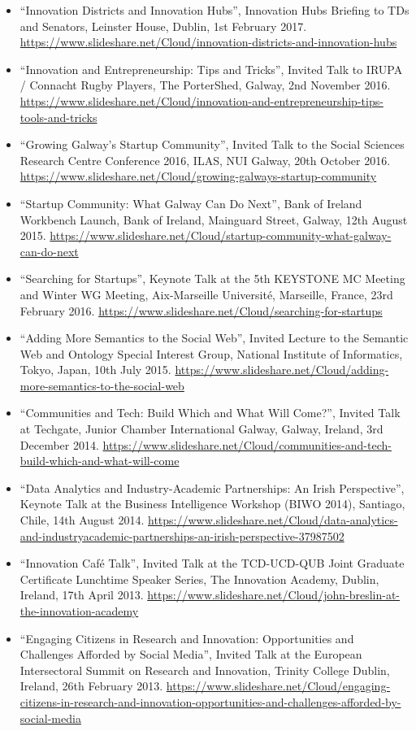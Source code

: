\documentclass[10pt,a4paper]{res} %
\begin{document}
\begin{resume}
\begin{itemize}
\item ``Innovation Districts and Innovation Hubs'', Innovation Hubs Briefing to TDs and Senators, Leinster House, Dublin, 1st February 2017. \url{https://www.slideshare.net/Cloud/innovation-districts-and-innovation-hubs}
\item ``Innovation and Entrepreneurship: Tips and Tricks'', Invited Talk to IRUPA / Connacht Rugby Players, The PorterShed, Galway, 2nd November 2016. \url{https://www.slideshare.net/Cloud/innovation-and-entrepreneurship-tips-tools-and-tricks}
\item ``Growing Galway's Startup Community'', Invited Talk to the Social Sciences Research Centre Conference 2016, ILAS, NUI Galway, 20th October 2016. \url{https://www.slideshare.net/Cloud/growing-galways-startup-community}
\item ``Startup Community: What Galway Can Do Next'', Bank of Ireland Workbench Launch, Bank of Ireland, Mainguard Street, Galway, 12th August 2015. \url{https://www.slideshare.net/Cloud/startup-community-what-galway-can-do-next}
\item ``Searching for Startups'', Keynote Talk at the 5th KEYSTONE MC Meeting and Winter WG Meeting, Aix-Marseille Universit\'{e}, Marseille, France, 23rd February 2016. \url{https://www.slideshare.net/Cloud/searching-for-startups}
\item ``Adding More Semantics to the Social Web'', Invited Lecture to the Semantic Web and Ontology Special Interest Group, National Institute of Informatics, Tokyo, Japan, 10th July 2015. \url{https://www.slideshare.net/Cloud/adding-more-semantics-to-the-social-web}
\item ``Communities and Tech: Build Which and What Will Come?'', Invited Talk at Techgate, Junior Chamber International Galway, Galway, Ireland, 3rd December 2014. \url{https://www.slideshare.net/Cloud/communities-and-tech-build-which-and-what-will-come}
\item ``Data Analytics and Industry-Academic Partnerships: An Irish Perspective'', Keynote Talk at the Business Intelligence Workshop (BIWO 2014), Santiago, Chile, 14th August 2014. \url{https://www.slideshare.net/Cloud/data-analytics-and-industryacademic-partnerships-an-irish-perspective-37987502}
\item ``Innovation Caf\'{e} Talk'', Invited Talk at the TCD-UCD-QUB Joint Graduate Certificate Lunchtime Speaker Series, The Innovation Academy, Dublin, Ireland, 17th April 2013. \url{https://www.slideshare.net/Cloud/john-breslin-at-the-innovation-academy}
\item ``Engaging Citizens in Research and Innovation: Opportunities and Challenges Afforded by Social Media'', Invited Talk at the European Intersectoral Summit on Research and Innovation, Trinity College Dublin, Ireland, 26th February 2013. \url{https://www.slideshare.net/Cloud/engaging-citizens-in-research-and-innovation-opportunities-and-challenges-afforded-by-social-media}

\end{itemize}
\end{resume}
\end{document}
